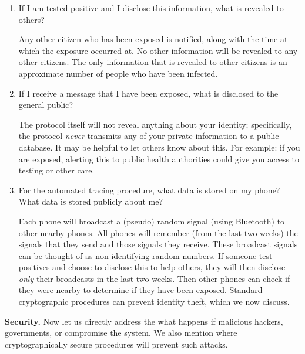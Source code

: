 \documentclass{article}
\newcommand{\TODO}[1]{ {\color{blue} #1 }}
\begin{document}
\begin{enumerate}[leftmargin=*]
\item If I am tested positive and I disclose this information, what is revealed to others?

Any other citizen who has been exposed is notified, along with the time at which the exposure occurred at. No other information will be revealed to any other citizens. The only information that is revealed to other citizens is an approximate number of people who have been infected.

\item If I receive a message that I have been exposed, what is disclosed to the general public? 
 
The protocol itself will not reveal anything about your identity; specifically, the protocol \emph{never} transmits any of your private information to a public database. It may be helpful to let others know about this. For example: if you are exposed, alerting this to public health authorities could give you access to testing or other care. 

\item For the automated tracing procedure, what data is stored on my phone? What data is stored publicly about me?

Each phone will broadcast a (pseudo) random signal (using Bluetooth) to other nearby phones. All phones will remember (from the last two weeks) the signals that they send and those signals they receive. These broadcast signals can be thought of as non-identifying random numbers. 
If someone test positives and choose to disclose this to help others, they will then disclose \emph{only} their broadcasts in the last two weeks. Then other phones can check if they were nearby to determine if they have been exposed. Standard cryptographic procedures can prevent identity theft, which we now discuss.

\end{enumerate}

\textbf{Security.} Now let us directly address the what happens if malicious hackers, governments, or compromise the system. We also mention where cryptographically secure procedures will prevent such attacks.   
\end{document}
